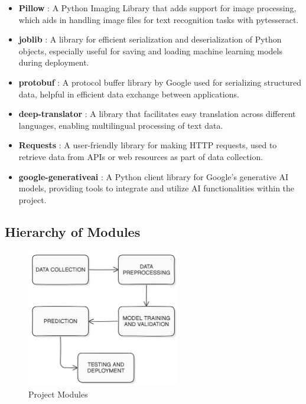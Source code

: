 \begin{itemize}
    \item \textbf{Pillow} :
    \noindent
    A Python Imaging Library that adds support for image processing, which aids in handling image files for text recognition tasks with pytesseract.

    \item \textbf{joblib} :
    \noindent
    A library for efficient serialization and deserialization of Python objects, especially useful for saving and loading machine learning models during deployment.
    
    \item \textbf{protobuf} :
    \noindent
    A protocol buffer library by Google used for serializing structured data, helpful in efficient data exchange between applications.
    
    \item \textbf{deep-translator} :
    \noindent
    A library that facilitates easy translation across different languages, enabling multilingual processing of text data.
    
    \item \textbf{Requests} :
    \noindent
    A user-friendly library for making HTTP requests, used to retrieve data from APIs or web resources as part of data collection.
    
    \item \textbf{google-generativeai} :
    \noindent
    A Python client library for Google’s generative AI models, providing tools to integrate and utilize AI functionalities within the project.
    
\end{itemize}


\subsection{Hierarchy of Modules}
\begin{figure}[h!]  
    \centering
    \includegraphics[width=0.6\textwidth]{Images/Project Modules.png}  
    \caption{Project Modules}
    \label{Project Modules}  %
\end{figure}

